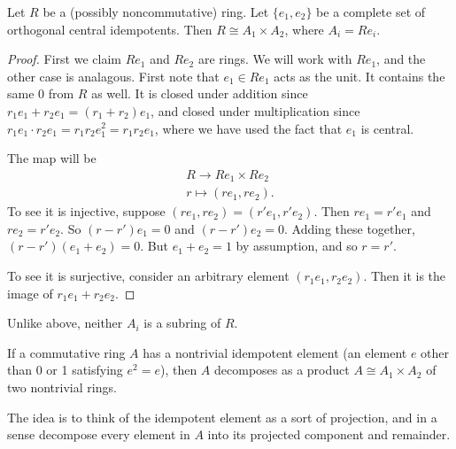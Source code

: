 \documentclass[12pt]{article}
\begin{document}
\begin{proposition}
	Let $R$ be a (possibly noncommutative) ring. Let $\{e_1,e_2\}$ be a complete set of orthogonal central idempotents. Then $R\cong A_1\times A_2$, where $A_i=Re_i$.
\end{proposition}
\begin{proof}
	First we claim $Re_1$ and $Re_2$ are rings. We will work with $Re_1$, and the other case is analagous. First note that $e_1\in Re_1$ acts as the unit. It contains the same 0 from $R$ as well. It is closed under addition since $r_1e_1+r_2e_1=(r_1+r_2)e_1$, and closed under multiplication since $r_1e_1\cdot r_2e_1=r_1r_2e_1^2=r_1r_2e_1$, where we have used the fact that $e_1$ is central.

	The map will be 
	\begin{gather*}
		R \to Re_1 \times Re_2 \\
		r \mapsto (re_1, re_2).
	\end{gather*}
	To see it is injective, suppose $(re_1,re_2)=(r'e_1, r'e_2)$. Then $re_1=r'e_1$ and $re_2=r'e_2$. So $(r-r')e_1=0$ and $(r-r')e_2=0$. Adding these together, $(r-r')(e_1+e_2)=0$. But $e_1+e_2=1$ by assumption, and so $r=r'$.

	To see it is surjective, consider an arbitrary element $(r_1e_1, r_2e_2)$. Then it is the image of $r_1e_1+r_2e_2$.
\end{proof}

\begin{remark}
	Unlike above, neither $A_i$ is a subring of $R$.
\end{remark}

\begin{proposition}
	If a commutative ring $A$ has a nontrivial idempotent element (an element $e$ other than 0 or 1 satisfying $e^2 = e$), then $A$ decomposes as a product $A \cong A_1 \times A_2$ of two nontrivial rings.
\end{proposition}

The idea is to think of the idempotent element as a sort of projection, and in a sense decompose every element in $A$ into its projected component and remainder.
\end{document}
